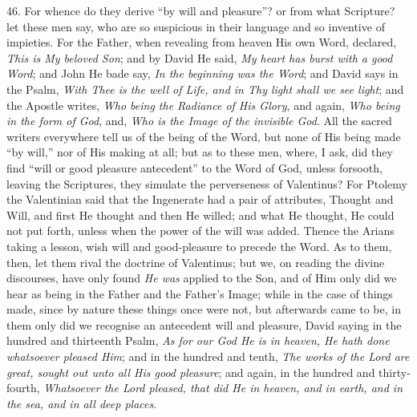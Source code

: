 46. For whence do they derive ``by
will and pleasure''? or from what Scripture? let these men say, who are
so suspicious in their language and so inventive of impieties. For the
Father, when revealing from heaven His own Word, declared, \emph{This is
My beloved Son}; and by David He said, \emph{My heart has burst with a
good Word}; and John He bade say, \emph{In the beginning was the Word};
and David says in the Psalm, \emph{With Thee is the well of Life, and in
Thy light shall we see light}; and the Apostle writes, \emph{Who being
the Radiance of His Glory}, and again, \emph{Who being in the form of
God}, and, \emph{Who is the Image of the invisible God}. All the
sacred writers everywhere tell us of the being of the Word, but none
of His being made ``by will,'' nor of His making at all; but as to these
men, where, I ask, did they find ``will or good pleasure antecedent'' to
the Word of God, unless forsooth, leaving the Scriptures, they
simulate the perverseness of Valentinus? For Ptolemy the Valentinian
said that the Ingenerate had a pair of attributes, Thought and Will,
and first He thought and then He willed; and what He thought, He could
not put forth, unless when the power of the will was added. Thence the
Arians taking a lesson, wish will and good-pleasure to precede the
Word. As to them, then, let them rival the doctrine of Valentinus; but
we, on reading the divine discourses, have only found \emph{He was}
applied to the Son, and of Him only did we hear as being in the Father
and the Father's Image; while in the case of things made, since by
nature these things once were not, but afterwards came to be, in them
only did we recognise an antecedent will and pleasure, David saying in
the hundred and thirteenth Psalm, \emph{As for our God He is in
heaven, He hath done whatsoever pleased Him}; and in the hundred
and tenth, \emph{The works of the Lord are great, sought out unto all His
good pleasure}; and again, in the hundred and thirty-fourth, \emph{Whatsoever
the Lord pleased, that did He in heaven, and in earth, and in the sea,
and in all deep places}.

